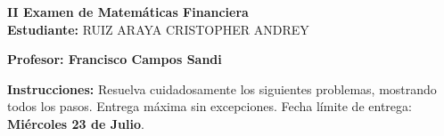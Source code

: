 \documentclass[10pt]{article}
\begin{document}
\newpage
\begin{center}
    {\LARGE \textbf{II Examen de Matemáticas Financiera}}\\[1em]
    {\large \textbf{Estudiante:} RUIZ ARAYA CRISTOPHER ANDREY}
\end{center}

\vspace{1cm}

\textbf{Profesor: Francisco Campos Sandi}

\vspace{0.5cm}

\textbf{Instrucciones:} Resuelva cuidadosamente los siguientes problemas, mostrando todos los pasos. Entrega máxima sin excepciones. Fecha límite de entrega: \textbf{Miércoles 23 de Julio}.

\vspace{1cm}
\end{document}
